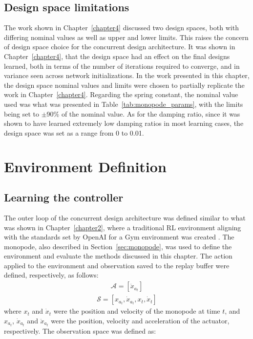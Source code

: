 \subsection{Design space limitations}
The work shown in Chapter~\ref{chapter4} discussed two design spaces, both with differing nominal values as well as upper and lower limits. This raises the concern of design space choice for the concurrent design architecture. It was shown in Chapter~\ref{chapter4}, that the design space had an effect on the final designs learned, both in terms of the number of iterations required to converge, and in variance seen across network initializations. In the work presented in this chapter, the design space nominal values and limits were chosen to partially replicate the work in Chapter~\ref{chapter4}. Regarding the spring constant, the nominal value used was what was presented in Table~\ref{tab:monopode_params}, with the limits being set to $\pm$90\% of the nominal value. As for the damping ratio, since it was shown to have learned extremely low damping ratios in most learning cases, the design space was set as a range from 0 to 0.01. 

\section{Environment Definition}
\subsection{Learning the controller}
The outer loop of the concurrent design architecture was defined similar to what was shown in Chapter~\ref{chapter2}, where a traditional RL environment aligning with the standards set by OpenAI for a Gym environment was created \cite{Brockman2016c}. The monopode, also described in Section~\ref{sec:monopode}, was used to define the environment and evaluate the methods discussed in this chapter. The action applied to the environment and observation saved to the replay buffer were defined, respectively, as follows:
% 
\begin{equation}
  \begin{aligned}
      \mathcal{A} = [\ddot{x}_{a_t}]
  \end{aligned}
\end{equation}
% 
\begin{equation}
  \begin{aligned}
    \mathcal{S} = \left[ x_{a_t}, \dot{x}_{a_t}, x_t, \dot{x}_t \right]
  \end{aligned}
\end{equation}
% 
where $x_t$ and $\dot{x}_t$ were the position and velocity of the monopode at time $t$, and $x_{a_t}$, $\dot{x}_{a_t}$ and $\ddot{x}_{a_t}$ were the position, velocity and acceleration of the actuator, respectively. The observation space was defined as:

